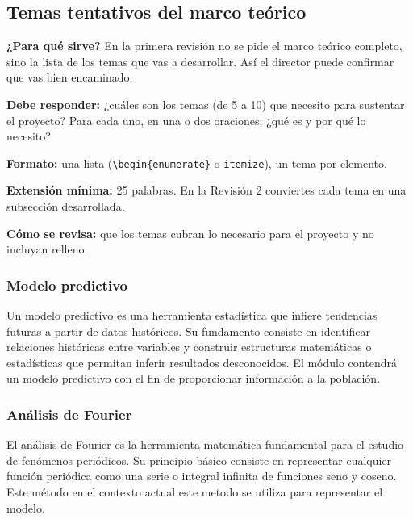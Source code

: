 

\subsection{Temas tentativos del marco teórico} \label{sec:temas_tentativos} %

\begin{guia}
\textbf{¿Para qué sirve?} En la primera revisión no se pide el marco teórico completo, sino la lista de los temas que
vas a desarrollar. Así el director puede confirmar que vas bien encaminado.

\textbf{Debe responder:} ¿cuáles son los temas (de 5 a 10) que necesito para sustentar el proyecto? Para cada uno, en una
o dos oraciones: ¿qué es y por qué lo necesito?

\textbf{Formato:} una lista (\verb|\begin{enumerate}| o \verb|itemize|), un tema por elemento.

\textbf{Extensión mínima:} 25 palabras. En la Revisión 2 conviertes cada tema en una subsección desarrollada.

\textbf{Cómo se revisa:} que los temas cubran lo necesario para el proyecto y no incluyan relleno.
\end{guia}

\subsubsection{Modelo predictivo}

Un modelo predictivo es una herramienta estadística que infiere tendencias futuras a partir de datos históricos. Su fundamento consiste en identificar relaciones históricas entre variables y construir estructuras matemáticas o estadísticas que permitan inferir resultados desconocidos.
El módulo contendrá un modelo predictivo con el fin de proporcionar información a la población.

\subsubsection{Análisis de Fourier}

El análisis de Fourier es la herramienta matemática fundamental para el estudio de fenómenos periódicos. Su principio básico consiste en representar cualquier función periódica como una serie o integral infinita de funciones seno y coseno. Este método en el contexto actual este metodo se utiliza para representar el modelo.

